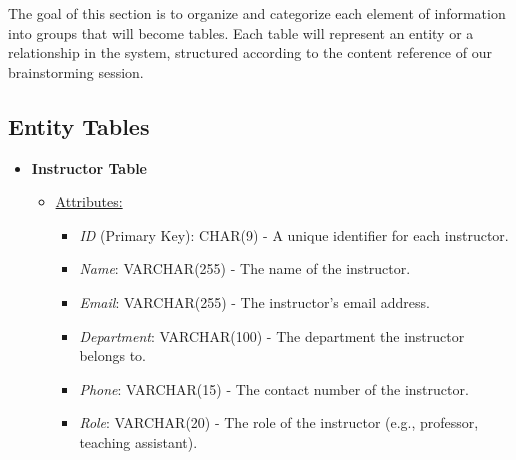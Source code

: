 \documentclass[12pt]{article}
\begin{document}
The goal of this section is to organize and categorize each element of information into groups that will become tables. Each table will represent an entity or a relationship in the system, structured according to the content reference of our brainstorming session.

\subsection*{Entity Tables}

\begin{itemize}
    \item \textbf{Instructor Table}
    \begin{itemize}
        \item \underline{Attributes:}
        \begin{itemize}
            \item \textit{ID} (Primary Key): CHAR(9) - A unique identifier for each instructor. 
            \item \textit{Name}: VARCHAR(255) - The name of the instructor.
            \item \textit{Email}: VARCHAR(255) - The instructor's email address.
            \item \textit{Department}: VARCHAR(100) - The department the instructor belongs to.
            \item \textit{Phone}: VARCHAR(15) - The contact number of the instructor.
            \item \textit{Role}: VARCHAR(20) - The role of the instructor (e.g., professor, teaching assistant).
        \end{itemize}
    \end{itemize}
    

\end{itemize}
\end{document}
